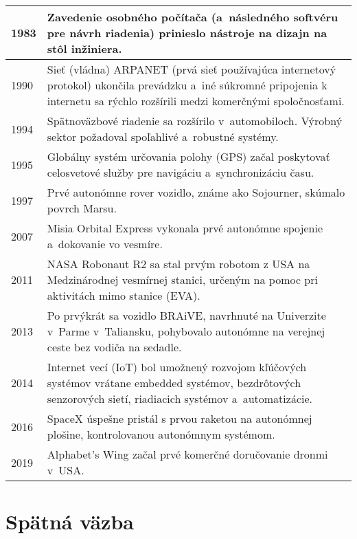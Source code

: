 \documentclass[a4paper, 10pt, ]{article}
\begin{document}
\begin{flushleft}
\begin{longtable}{  @{}  l @{\extracolsep{\fill}} p{}<{\raggedright} @{}   }
    1983 & Zavedenie osobného počítača (a~následného softvéru pre návrh riadenia) prinieslo nástroje na dizajn na stôl inžiniera. \\  \midrule
    1990 & Sieť (vládna) ARPANET (prvá sieť používajúca internetový protokol) ukončila prevádzku a~iné súkromné pripojenia k internetu sa rýchlo rozšírili medzi komerčnými spoločnosťami. \\  \midrule
    1994 & Spätnoväzbové riadenie sa rozšírilo v~automobiloch. Výrobný sektor požadoval spoľahlivé a~robustné systémy. \\  \midrule
    1995 & Globálny systém určovania polohy (GPS) začal poskytovať celosvetové služby pre navigáciu a~synchronizáciu času. \\  \midrule
    1997 & Prvé autonómne rover vozidlo, známe ako Sojourner, skúmalo povrch Marsu. \\  \midrule
    2007 & Misia Orbital Express vykonala prvé autonómne spojenie a~dokovanie vo vesmíre. \\  \midrule
    2011 & NASA Robonaut R2 sa stal prvým robotom z USA na Medzinárodnej vesmírnej stanici, určeným na pomoc pri aktivitách mimo stanice (EVA). \\  \midrule
    2013 & Po prvýkrát sa vozidlo BRAiVE, navrhnuté na Univerzite v~Parme v~Taliansku, pohybovalo autonómne na verejnej ceste bez vodiča na sedadle. \\  \midrule
    2014 & Internet vecí (IoT) bol umožnený rozvojom kľúčových systémov vrátane embedded systémov, bezdrôtových senzorových sietí, riadiacich systémov a~automatizácie. \\  \midrule
    2016 & SpaceX úspešne pristál s prvou raketou na autonómnej plošine, kontrolovanou autonómnym systémom. \\  \midrule
    2019 & Alphabet’s Wing začal prvé komerčné doručovanie dronmi v~USA. \\  
    \bottomrule    
\end{longtable}


\end{flushleft}










\section{Spätná väzba}
\end{document}
